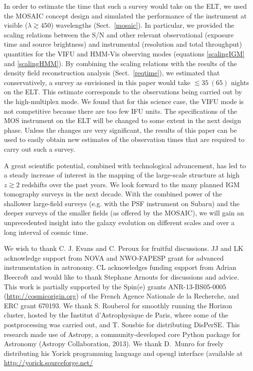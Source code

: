 \documentclass{aa}
\begin{document}
In order to estimate the time that such a survey would take on the ELT, we used the MOSAIC concept design and simulated the performance of the instrument at visible ($\lambda \gtrsim 450$) wavelengths (Sect.~\ref{mosaic}). In particular, we provided the scaling relations between the S/N and other relevant observational (exposure time and source brightness) and instrumental (resolution and total throughput) quantities for the VIFU and HMM-Vis observing modes (equations \ref{scalingIGM} and \ref{scalingHMM}). By combining the scaling relations with the results of the density field reconstruction analysis (Sect.~\ref{reqtime}), we estimated that conservatively, a survey as envisioned in this paper would take $\lesssim 35~(65)$ nights on the ELT. This estimate corresponds to the observations being carried out by the high-multiplex mode. We found that for this science case, the VIFU mode is not competitive because there are too few IFU units. The specifications of the MOS instrument on the ELT will be changed to some extent in the next design phase. Unless the changes are very significant, the results of this paper can be used to easily obtain new estimates of the observation times that are required to carry out such a survey. 

A great scientific potential, combined with technological advancement, has led to a steady increase of interest in the mapping of the large-scale structure at high $z \gtrsim 2$ redshifts over the past years. We look forward to the many planned IGM tomography surveys in the next decade. With the combined power of the shallower large-field surveys (e.g. with the PSF instrument on Subaru) and the deeper surveys of the smaller fields (as offered by the MOSAIC), we will gain an unprecedented insight into the galaxy evolution on different scales and over a long interval of cosmic time.  

\begin{acknowledgements}

We wish to thank C. J. Evans and C. Peroux for fruitful discussions. JJ and LK acknowledge support from NOVA and NWO-FAPESP grant for advanced instrumentation in astronomy. CL acknowledges funding support from Adrian Beecroft and would like to thank Stephane Arnouts for discussions and advice. This work is partially supported by the Spin(e) grants ANR-13-BS05-0005 (\url{http://cosmicorigin.org}) of the French Agence Nationale de la Recherche, and ERC grant 670193. We thank S. Rouberol for smoothly running the Horizon cluster, hosted by the Institut d’Astrophysique de Paris, where some of the postprocessing was carried out, and T. Sousbie for distributing {\sc DisPerSE}. This research made use of Astropy, a community-developed core Python package for Astronomy (Astropy Collaboration, 2013). We thank D.~Munro for freely distributing his {\sc \small  Yorick} programming language and opengl interface (available at \url{http://yorick.sourceforge.net/}

\end{acknowledgements}
\end{document}
